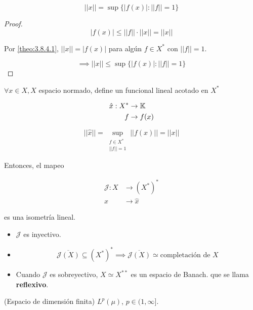 \begin{fcorollary}
    \[||x||=\sup\{|f(x)|:||f||=1\}\]
\end{fcorollary}

\begin{proof}
    \[|f(x)|\leq ||f||\cdot ||x||=||x||\]

    Por \ref{theo:3.8.4.1}, $||x||=|f(x)|$ para algún $f\in X^*$ con $||f||=1$.

    \[\implies ||x||\leq \sup\{|f(x)|:||f||=1\}\]
\end{proof}

\begin{ftheorem}
    $\forall x\in X, X$ espacio normado, define un funcional lineal acotado en $X^*$

    \begin{align*}
        \hat x:X^*&\to\mathbb{K}\\
        f&\to f(x)
    \end{align*}

    \[||\hat x||=\sup_{\substack{f\in X^*\\ ||f||=1}}||f(x)||=||x||\]

    Entonces, el mapeo 

    \begin{align*}
        \mathcal{J}:X&\to (X^*)^*\\
        x&\to \hat x
    \end{align*}

    es una isometría lineal.
\end{ftheorem}

 \begin{fnote}\hfill
    \begin{itemize}
        \item $\mathcal{J}$ es inyectivo.

        \item \[\overline{\mathcal{J}(X)}\subseteq (X^*)^*\implies \overline{\mathcal{J}(X)}\simeq \text{completación de }X\]

        \item Cuando $\mathcal{J}$ es sobreyectivo, $X\simeq X^{**}$ es un espacio de Banach. que se llama \textbf{reflexivo}.
    \end{itemize}
 \end{fnote}

 \begin{fexample}
    (Espacio de dimensión finita) $L^p(\mu)$, $p\in (1,\infty]$.
 \end{fexample}